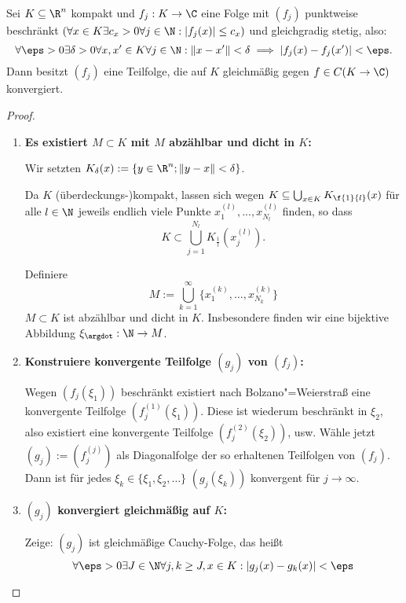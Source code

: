 \begin{st} \label{1.29}
	Sei $K \subset \R^n$ kompakt und $f_j : K \to \C$ eine Folge mit $(f_j)$ punktweise beschränkt $(\forall x \in K \exists c_x >0 \forall j\in \N : |f_j(x)|\le c_x)$ und gleichgradig stetig, also:
	\[
		\forall \eps > 0 \exists \delta > 0 \forall x,x' \in K \forall j \in \N : \|x-x'\| < \delta \implies |f_j(x)-f_j(x')| < \eps.
	\]
	Dann besitzt $(f_j)$ eine Teilfolge, die auf $K$ gleichmäßig gegen $f\in C(K \to \C)$ konvergiert.
	\begin{proof}
		\begin{enumerate}[1)]
			\item
				\textbf{Es existiert $M \subset K$ mit $M$ abzählbar und dicht in $K$:}

				  Wir setzten $ K_\delta(x):= \{y\in \R^n; \|y-x\|<\delta \} $.

				  Da $ K $ (überdeckungs-)kompakt, lassen sich wegen $ K\subset \bigcup_{x\in K} K_{\f{1}{l}}(x) $ für alle $ l\in \N $ jeweils endlich viele Punkte $ x_1^{(l)},..., x^{(l)}_{N_l} $ finden, so dass
				  \[
				  K\subset \bigcup_{j=1}^{N_l} K_{\frac{1}{l}}(x_j^{(l)}).
				  \]

					Definiere
					\[
						M := \bigcup_{k=1}^\infty \Big\{x_1^{(k)}, \dotsc, x_{N_k}^{(k)}\Big\}
					\]
					$M \subset K$ ist abzählbar und dicht in $K$.
					Insbesondere finden wir eine bijektive Abbildung $ \xi_\argdot: \N \to M $.

			\item
				\textbf{Konstruiere konvergente Teilfolge $(g_j)$ von $(f_j)$:}

					Wegen $(f_j(\xi_1))$ beschränkt existiert nach Bolzano"=Weierstraß eine konvergente Teilfolge $(f_j^{(1)}(\xi_1))$.
					Diese ist wiederum beschränkt in $\xi_2$, also existiert eine konvergente Teilfolge $(f_j^{(2)}(\xi_2))$, usw.
					Wähle jetzt $(g_j) := (f_j^{(j)})$ als Diagonalfolge der so erhaltenen Teilfolgen von $(f_j)$.
					Dann ist für jedes $\xi_k \in \{\xi_1, \xi_2, \dotsc\}$ $(g_j(\xi_k))$ konvergent für $j \to \infty$.
			\item
				\textbf{$(g_j)$ konvergiert gleichmäßig auf $K$:}

					Zeige: $(g_j)$ ist gleichmäßige Cauchy-Folge, das heißt
					\[
						\forall \eps > 0 \exists J \in \N \forall j,k \ge J, x \in K : |g_j(x) - g_k(x)| < \eps
					\]


\end{enumerate}
\end{proof}
\end{st}
